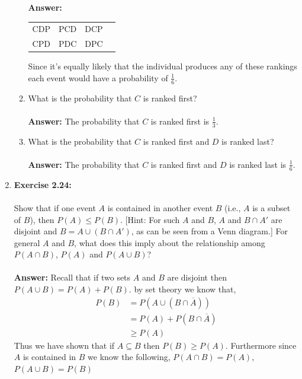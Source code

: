 \documentclass[12pt]{article}
\theoremstyle{homework}
\begin{document}
\begin{enumerate}
\begin{enumerate}
\textbf{Answer:}
\begin{center}
 \begin{tabular}{c c c c}
 CDP & PCD & DCP \\
 CPD & PDC & DPC
 \end{tabular}
\end{center}
Since it's equally likely that the individual produces any of these rankings each event would have a probability of $\frac{1}{6}$.

\item What is the probability that $C$ is ranked first?\\
\\
 \textbf{Answer:} The probability that $C$ is ranked first is $\frac{1}{3}$.
 \\
\item What is the probability that $C$ is ranked first and $D$ is ranked last?\\
\\
 \textbf{Answer:} The probability that $C$ is ranked first and $D$ is ranked last is $\frac{1}{6}$.
 \\
\end{enumerate}
\vspace{1in}


\item\hspace{.5in}\textbf{Exercise 2.24:}\\
\\
Show that if one event $A$ is contained in another event $B$ (i.e., $A$ is a subset of $B$), then $P(A) \leq P(B).$ [Hint: For such $A$ and $B$, $A$ and $B\cap A'$ are disjoint and $B= A \cup (B \cap A')$, as can be seen from a Venn diagram.] For general $A$ and $B$, what does this imply about the relationship among $P(A\cap B)$, $P(A)$ and $P(A \cup B)$?\\
\\
 \textbf{Answer:} Recall that if two sets $A$ and $B$ are disjoint then $P(A\cup B) = P(A) +P(B)$. by set theory we know that,
 \begin{align*}
   P(B) &= P(A \cup (B\cap\overline{A}))\\
   &= P(A) + P(B\cap\overline{A})\\
   &\geq P(A)
 \end{align*}
Thus we have shown that if $A \subseteq B$ then $P(B) \geq P(A)$. Furthermore since $A$ is contained in $B$ we know the following, $P(A \cap B) = P(A)$, $P(A \cup B) = P(B)$





\end{enumerate}
\end{document}
